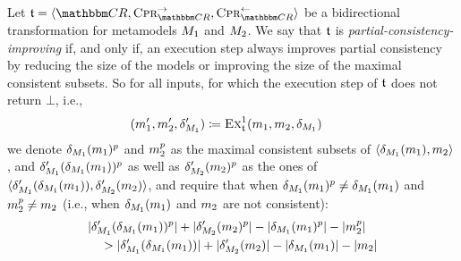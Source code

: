\begin{definition}
    \label{def:partialconsistencyimprovingtransformation}
    Let $\transformation{t} = \tupled{\consistencyrelationset{CR}, \consistencypreservationrule{\consistencyrelationset{CR}}^{\rightarrow}, \consistencypreservationrule{\consistencyrelationset{CR}}^{\leftarrow}}$ be a bidirectional transformation for metamodels $\metamodel{M}{1}$ and $\metamodel{M}{2}$.
    We say that $\transformation{t}$ is \emph{partial-consistency-improving} if, and only if, an execution step always improves partial consistency by reducing the size of the models or improving the size of the maximal consistent subsets.
    So for all inputs, for which the execution step of $\transformation{t}$ does not return $\bot$, i.e.,
    \begin{align*}
        & (\model{m}{1}', \model{m}{2}', \change{\metamodel{M}{1}}') \equalsperdefinition \function{Ex}_{\transformation{t}}^1(\model{m}{1}, \model{m}{2}, \change{\metamodel{M}{1}})
    \end{align*}
    we denote $\change{\metamodel{M}{1}}(\model{m}{1})^p$ and $\model{m}{2}^p$ as the maximal consistent subsets of $\tupled{\change{\metamodel{M}{1}}(\model{m}{1}), \model{m}{2}}$, and $\change{\metamodel{M}{1}}'(\change{\metamodel{M}{1}}(\model{m}{1}))^p$ as well as $\change{\metamodel{M}{2}}'(\model{m}{2})^p$ as the ones of $\tupled{\change{\metamodel{M}{1}}'(\change{\metamodel{M}{1}}(\model{m}{1})), \change{\metamodel{M}{2}}'(\model{m}{2})}$,
    and require that when $\change{\metamodel{M}{1}}(\model{m}{1})^p \neq \change{\metamodel{M}{1}}(\model{m}{1})$ and $\model{m}{2}^p \neq \model{m}{2}$ (i.e., when $\change{\metamodel{M}{1}}(\model{m}{1})$ and $\model{m}{2}$ are not consistent):
    \begin{align*}
        &
        \abs{\change{\metamodel{M}{1}}'(\change{\metamodel{M}{1}}(\model{m}{1}))^p} + \abs{\change{\metamodel{M}{2}}'(\model{m}{2})^p} 
        - \abs{\change{\metamodel{M}{1}}(\model{m}{1})^p} - \abs{\model{m}{2}^p} \\
        & \formulaskip
        > \abs{\change{\metamodel{M}{1}}'(\change{\metamodel{M}{1}}(\model{m}{1}))} + \abs{\change{\metamodel{M}{2}}'(\model{m}{2})} 
        - \abs{\change{\metamodel{M}{1}}(\model{m}{1})} - \abs{\model{m}{2}}
    \end{align*}
\end{definition}

